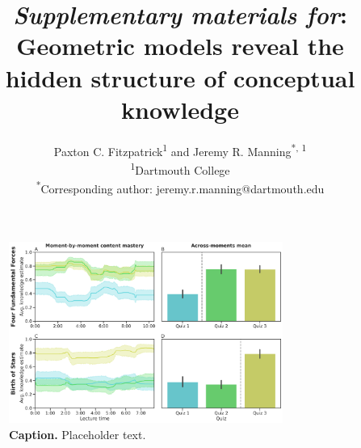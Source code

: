 \documentclass[10pt]{article}
\title{\textit{Supplementary materials for}: Geometric models reveal the hidden structure of conceptual knowledge}
\author{Paxton C. Fitzpatrick\textsuperscript{1} and Jeremy R.
Manning\textsuperscript{*, 1}\\\textsuperscript{1}Dartmouth
College\\\textsuperscript{*}Corresponding author:
jeremy.r.manning@dartmouth.edu}
\date{}
\newcommand{\demo}{1}
\begin{document}
\renewcommand{\figurename}{Supplementary Figure}

\setcounter{equation}{0}
\setcounter{figure}{0}
\setcounter{table}{0}
\setcounter{page}{1}
\setcounter{section}{0}
\makeatletter
\renewcommand{\theequation}{S\arabic{equation}}
\renewcommand{\thefigure}{S\arabic{figure}}
\renewcommand{\bibnumfmt}[1]{[S#1]}
\renewcommand{\citenumfont}[1]{S#1}


\maketitle

\begin{figure}[tp]
\centering
\includegraphics[width=0.8\textwidth]{figs/content-mastery}
\caption{\textbf{Caption.} Placeholder text.}
\label{fig:demo}
\end{figure}

\newpage
\renewcommand{\refname}{Supplementary references}


\end{document}
